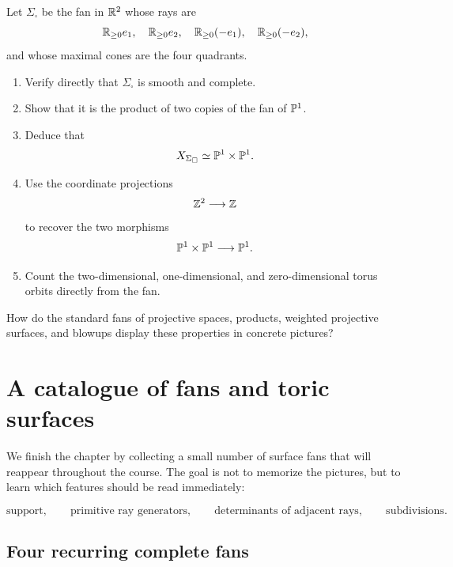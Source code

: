 \begin{surfacelaboratory}
Let \(\Sigma_{\square}\) be the fan in \(\mathbb{R}^2\) whose rays are
\[
\mathbb{R}_{\geq0}e_1,\quad
\mathbb{R}_{\geq0}e_2,\quad
\mathbb{R}_{\geq0}(-e_1),\quad
\mathbb{R}_{\geq0}(-e_2),
\]
and whose maximal cones are the four quadrants.

\begin{enumerate}[label=(\alph*),wide=0pt]
\item Verify directly that \(\Sigma_{\square}\) is smooth and
complete.

\item Show that it is the product of two copies of the fan of
\(\mathbb{P}^1\).

\item Deduce that
\[
X_{\Sigma_{\square}}
\simeq
\mathbb{P}^1\times\mathbb{P}^1.
\]

\item Use the coordinate projections
\[
\mathbb{Z}^2\longrightarrow\mathbb{Z}
\]
to recover the two morphisms
\[
\mathbb{P}^1\times\mathbb{P}^1\longrightarrow\mathbb{P}^1.
\]

\item Count the two-dimensional, one-dimensional, and zero-dimensional
torus orbits directly from the fan.
\end{enumerate}
\end{surfacelaboratory}

\begin{guidingquestion}
How do the standard fans of projective spaces, products, weighted
projective surfaces, and blowups display these properties in concrete
pictures?
\end{guidingquestion}


\section{A catalogue of fans and toric surfaces}
\label{sec:catalogue-fans-toric-surfaces}

We finish the chapter by collecting a small number of surface fans
that will reappear throughout the course. The goal is not to memorize
the pictures, but to learn which features should be read immediately:

\[
\text{support},\qquad
\text{primitive ray generators},\qquad
\text{determinants of adjacent rays},\qquad
\text{subdivisions}.
\]

\subsection{Four recurring complete fans}

